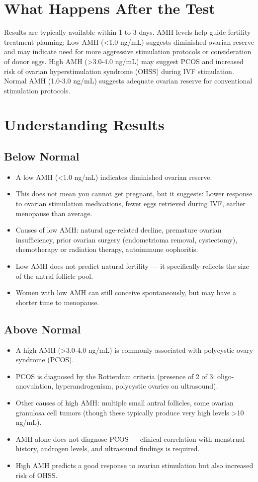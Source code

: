 \section*{What Happens After the Test}
Results are typically available within 1 to 3 days. AMH levels help guide fertility treatment planning: Low AMH (<1.0 ng/mL) suggests diminished ovarian reserve and may indicate need for more aggressive stimulation protocols or consideration of donor eggs. High AMH (>3.0-4.0 ng/mL) may suggest PCOS and increased risk of ovarian hyperstimulation syndrome (OHSS) during IVF stimulation. Normal AMH (1.0-3.0 ng/mL) suggests adequate ovarian reserve for conventional stimulation protocols.

\section*{Understanding Results}

\subsection*{Below Normal}
\begin{itemize}
  \item A low AMH (<1.0 ng/mL) indicates diminished ovarian reserve.
  \item This does not mean you cannot get pregnant, but it suggests: Lower response to ovarian stimulation medications, fewer eggs retrieved during IVF, earlier menopause than average.
  \item Causes of low AMH: natural age-related decline, premature ovarian insufficiency, prior ovarian surgery (endometrioma removal, cystectomy), chemotherapy or radiation therapy, autoimmune oophoritis.
  \item Low AMH does not predict natural fertility --- it specifically reflects the size of the antral follicle pool.
  \item Women with low AMH can still conceive spontaneously, but may have a shorter time to menopause.
\end{itemize}

\subsection*{Above Normal}
\begin{itemize}
  \item A high AMH (>3.0-4.0 ng/mL) is commonly associated with polycystic ovary syndrome (PCOS).
  \item PCOS is diagnosed by the Rotterdam criteria (presence of 2 of 3: oligo-anovulation, hyperandrogenism, polycystic ovaries on ultrasound).
  \item Other causes of high AMH: multiple small antral follicles, some ovarian granulosa cell tumors (though these typically produce very high levels >10 ng/mL).
  \item AMH alone does not diagnose PCOS --- clinical correlation with menstrual history, androgen levels, and ultrasound findings is required.
  \item High AMH predicts a good response to ovarian stimulation but also increased risk of OHSS.
\end{itemize}

